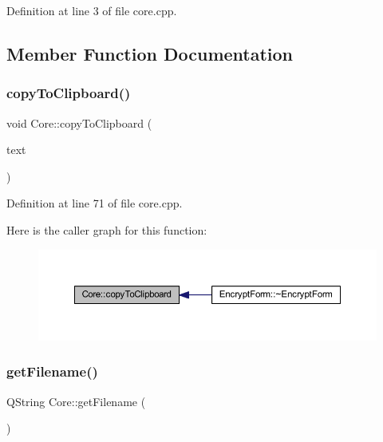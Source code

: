 Definition at line 3 of file core.\+cpp.



\subsection{Member Function Documentation}
\hypertarget{class_core_a3f943c730fb3d550dd4d7f82667beebb}{}\label{class_core_a3f943c730fb3d550dd4d7f82667beebb} 
\subsubsection{\texorpdfstring{copy\+To\+Clipboard()}{copyToClipboard()}}
{\footnotesize\ttfamily void Core\+::copy\+To\+Clipboard (\begin{DoxyParamCaption}\item[{Q\+String}]{text }\end{DoxyParamCaption})}



Definition at line 71 of file core.\+cpp.

Here is the caller graph for this function\+:\nopagebreak
\begin{figure}[H]
\begin{center}
\leavevmode
\includegraphics[width=350pt]{class_core_a3f943c730fb3d550dd4d7f82667beebb_icgraph}
\end{center}
\end{figure}
\hypertarget{class_core_aa75cf5dbf2f48a261a8596c42cf99946}{}\label{class_core_aa75cf5dbf2f48a261a8596c42cf99946} 
\subsubsection{\texorpdfstring{get\+Filename()}{getFilename()}}
{\footnotesize\ttfamily Q\+String Core\+::get\+Filename (\begin{DoxyParamCaption}{ }\end{DoxyParamCaption})}



